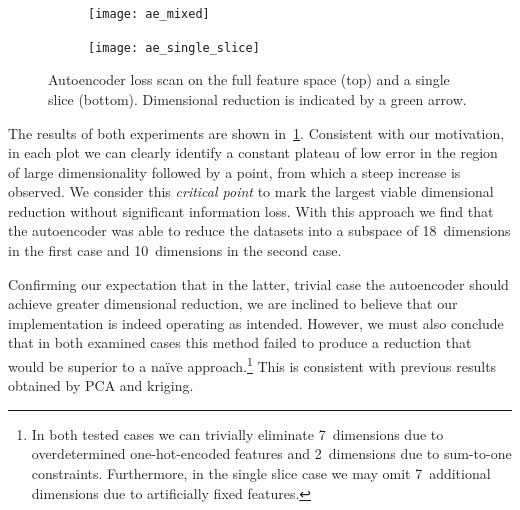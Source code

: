 \begin{figure} %
	\centering
	\vspace{-1ex}
	\begin{subfigure}[b]{\linewidth}
		\texttt{[image: ae\_mixed]}
	\end{subfigure}

	\vspace{-0.2ex}

	\begin{subfigure}[b]{\linewidth}
		\texttt{[image: ae\_single\_slice]}
	\end{subfigure}

	\caption{Autoencoder loss scan on the full feature space (top) and a single slice
		(bottom). Dimensional reduction is indicated by a green arrow.}
	\label{fig:autoencoder-loss}
	\vspace{-10ex}
\end{figure}

The results of both experiments are shown in~\cref{fig:autoencoder-loss}.
Consistent with our motivation, in each plot we can clearly identify a constant
plateau of low error in the region of large dimensionality followed by a point,
from which a steep increase is observed.
We consider this \textit{critical point} to mark the largest viable
dimensional reduction without significant information loss.
With this approach we find that the autoencoder was able to reduce the
datasets into a subspace of 18~dimensions in the first case and 10~dimensions in
the second case.

Confirming our expectation that in the latter, trivial case the
autoencoder should achieve greater dimensional reduction, we are inclined to
believe that our implementation is indeed operating as intended. However, we
must also conclude that in both examined cases this method failed to produce a
reduction that would be superior to a naïve approach.\footnote{In both tested cases we
	can trivially eliminate 7~dimensions due to overdetermined one-hot-encoded
	features and 2~dimensions due to sum-to-one constraints. Furthermore, in the
	single slice case we may omit 7~additional dimensions due to artificially fixed
features.} This is consistent with previous results obtained by PCA and kriging.



